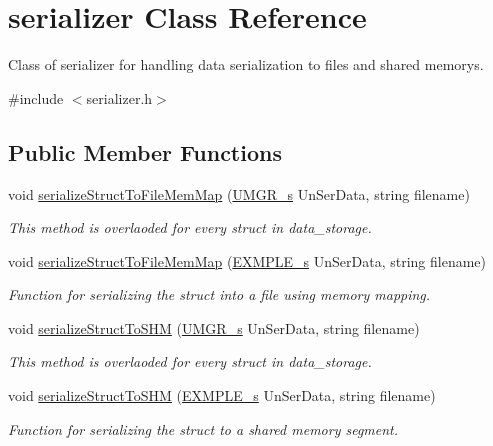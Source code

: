 \hypertarget{classserializer}{}\section{serializer Class Reference}
\label{classserializer}


Class of serializer for handling data serialization to files and shared memorys.  




{\ttfamily \#include $<$serializer.\+h$>$}

\subsection*{Public Member Functions}
\begin{DoxyCompactItemize}
\item 
void \hyperlink{classserializer_a452477e4c216e38170128ae322bda7f9}{serialize\+Struct\+To\+File\+Mem\+Map} (\hyperlink{structUMGR__s}{U\+M\+G\+R\+\_\+s} Un\+Ser\+Data, string filename)
\begin{DoxyCompactList}\small\item\em This method is overlaoded for every struct in data\+\_\+storage. \end{DoxyCompactList}\item 
void \hyperlink{classserializer_ac313f0009f2a0612534248e408287cb2}{serialize\+Struct\+To\+File\+Mem\+Map} (\hyperlink{structEXMPLE__s}{E\+X\+M\+P\+L\+E\+\_\+s} Un\+Ser\+Data, string filename)
\begin{DoxyCompactList}\small\item\em Function for serializing the struct into a file using memory mapping. \end{DoxyCompactList}\item 
void \hyperlink{classserializer_a80bfb108b2cab0ec030c32a4d6aa9ad3}{serialize\+Struct\+To\+S\+HM} (\hyperlink{structUMGR__s}{U\+M\+G\+R\+\_\+s} Un\+Ser\+Data, string filename)
\begin{DoxyCompactList}\small\item\em This method is overlaoded for every struct in data\+\_\+storage. \end{DoxyCompactList}\item 
void \hyperlink{classserializer_afb4c60973c4be742fb82cb23d43e8fac}{serialize\+Struct\+To\+S\+HM} (\hyperlink{structEXMPLE__s}{E\+X\+M\+P\+L\+E\+\_\+s} Un\+Ser\+Data, string filename)
\begin{DoxyCompactList}\small\item\em Function for serializing the struct to a shared memory segment. \end{DoxyCompactList}\item 

\end{DoxyCompactItemize}
